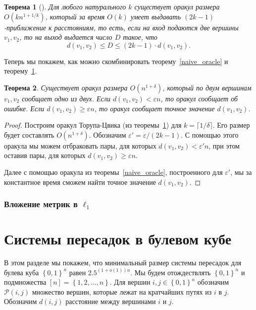 \documentclass[12pt]{article}
\newcommand{\eps}{\varepsilon}
\newcommand{\set}[1]{\left\{#1\right\}}
\newcommand{\zo}{\set{0, 1}}
\newcommand{\Pc}{\mathcal{P}}
\newtheorem{theorem}{Теорема}
\begin{document}
    \begin{theorem}[\cite{TZ05}]
        \label{thorup_zwick}
        Для любого натурального $k$ существует оракул размера $O(kn^{1 + 1/k})$, который за время $O(k)$
        умеет выдавать $(2k - 1)$-приближение к расстояниям, то есть, если на вход подаются две вершины $v_1, v_2$,
        то на выход выдается число $D$ такое, что
        $$
            d(v_1, v_2) \leq D \leq (2k - 1) \cdot d(v_1, v_2).
        $$
    \end{theorem}

    Теперь мы покажем, как можно скомбинировать теорему~\ref{naive_oracle} и теорему~\ref{thorup_zwick}.

    \begin{theorem}
        Существует оракул размера $O(n^{1 + \delta})$, который по двум вершинам $v_1, v_2$ сообщает одно из двух.
        Если $d(v_1, v_2) < \eps n$, то оракул сообщает об ошибке. Если $d(v_1, v_2) \geq \eps n$,
        то оракул сообщает точное значение $d(v_1, v_2)$.
    \end{theorem}
    \begin{proof}
        Построим оракул Торупа-Цвика (из теоремы~\ref{thorup_zwick}) для $k = \lceil 1 / \delta \rceil$.
        Его размер будет составлять $O(n^{1 + \delta})$. Обозначим $\eps' = \eps / (2k - 1)$.
        С помощью этого оракула мы можем отбраковать пары, для которых $d(v_1, v_2) < \eps' n$, при этом
        оставив пары, для которых $d(v_1, v_2) \geq \eps n$.

        Далее с помощью оракула из теоремы~\ref{naive_oracle}, построенного для $\eps'$, мы за константное время
        сможем найти точное значение $d(v_1, v_2)$.
    \end{proof}
    \subsubsection{Вложение метрик в $\ell_1$}
    \label{subsubsection_metric_embeddings}
    \section{Системы пересадок в булевом кубе}
    \label{section_hub_labels}
    В этом разделе мы покажем, что минимальный размер системы пересадок для булева куба $\zo^n$ равен $2.5^{(1+o(1))n}$.
    Мы будем отождествлять $\zo^n$ и подмножества $[n] = \set{1, 2, \ldots, n}$. Для вершин $i, j \in \zo^n$ обозначим $\Pc(i, j)$ множество вершин, которые лежат
    на кратчайших путях из $i$ в $j$. Обозначим $d(i, j)$ расстояние между вершинами $i$ и $j$.
\end{document}
